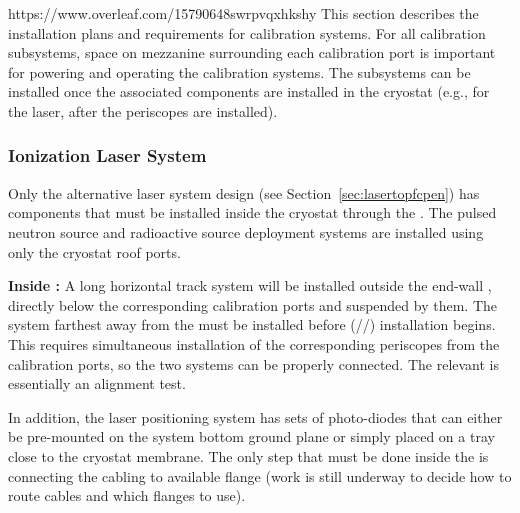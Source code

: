 

https://www.overleaf.com/15790648swrpvqxhkshy
This section describes the installation plans and requirements for calibration systems. For all calibration subsystems, space on mezzanine surrounding each calibration port is important for powering and operating the calibration systems. The subsystems can be installed once the associated components are installed in the cryostat (e.g., for the laser, after the periscopes are installed).

\subsubsection{Ionization Laser System} 
Only the alternative laser system  design (see Section~\ref{sec:lasertopfcpen})  has components that must be installed inside the cryostat through the . The pulsed neutron source and radioactive source deployment systems are installed using only the cryostat roof ports.


{\bf Inside :} A long horizontal track system will be installed outside the end-wall , directly below the corresponding calibration ports and suspended by them. The system farthest away from the  must be installed before  (//) installation begins. This requires simultaneous installation of the corresponding periscopes from the calibration ports, so the two systems can be properly connected. The relevant  is essentially an alignment test.

In addition, the laser positioning system has sets of photo-diodes that can either be pre-mounted on the  system bottom ground plane or simply placed on a tray close to the cryostat membrane. The only step that must be done inside the  is connecting the cabling to available flange (work is still underway to decide how to route cables and which flanges to use).


